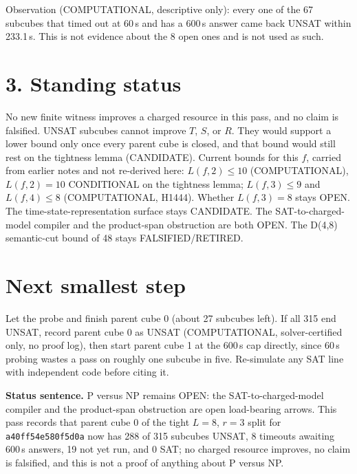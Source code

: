 \documentclass[11pt]{article}
\begin{document}
Observation (COMPUTATIONAL, descriptive only): every one of the 67 subcubes that timed out at 60\,s and has a 600\,s answer came back UNSAT within 233.1\,s. This is not evidence about the 8 open ones and is not used as such.

\section*{3. Standing status}
No new finite witness improves a charged resource in this pass, and no claim is falsified. UNSAT subcubes cannot improve $T$, $S$, or $R$. They would support a lower bound only once every parent cube is closed, and that bound would still rest on the tightness lemma (CANDIDATE). Current bounds for this $f$, carried from earlier notes and not re-derived here: $L(f,2)\le 10$ (COMPUTATIONAL), $L(f,2)=10$ CONDITIONAL on the tightness lemma; $L(f,3)\le 9$ and $L(f,4)\le 8$ (COMPUTATIONAL, H1444). Whether $L(f,3)=8$ stays OPEN. The time-state-representation surface stays CANDIDATE. The SAT-to-charged-model compiler and the product-span obstruction are both OPEN. The D(4,8) semantic-cut bound of 48 stays FALSIFIED/RETIRED.

\section*{Next smallest step}
Let the probe and  finish parent cube 0 (about 27 subcubes left). If all 315 end UNSAT, record parent cube 0 as UNSAT (COMPUTATIONAL, solver-certified only, no proof log), then start parent cube 1 at the 600\,s cap directly, since 60\,s probing wastes a pass on roughly one subcube in five. Re-simulate any SAT line with independent code before citing it.

\bigskip
\noindent\textbf{Status sentence.} P versus NP remains OPEN: the SAT-to-charged-model compiler and the product-span obstruction are open load-bearing arrows. This pass records that parent cube 0 of the tight $L=8$, $r=3$ split for \texttt{a40ff54e580f5d0a} now has 288 of 315 subcubes UNSAT, 8 timeouts awaiting 600\,s answers, 19 not yet run, and 0 SAT; no charged resource improves, no claim is falsified, and this is not a proof of anything about P versus NP.
\end{document}
